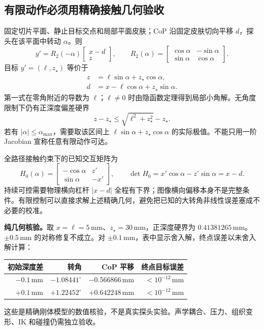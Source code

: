 \documentclass[11pt,a4paper]{article}
\numberwithin{equation}{section}
\theoremstyle{definition}
\begin{document}
\subsection{有限动作必须用精确接触几何验收}
固定切片平面、静止目标交点和局部平面皮肤；CoP 沿固定皮肤切向平移 $d$，探头在该平面中转动 $\alpha$。则
\begin{equation}
 y'=R_2(-\alpha)\begin{bmatrix}x-d\\z\end{bmatrix},\qquad
 R_2(\alpha)=\begin{bmatrix}\cos\alpha&-\sin\alpha\\\sin\alpha&\cos\alpha\end{bmatrix}.
\end{equation}
目标 $y'=(\ell,z_\star)$ 等价于
\begin{align}
 z&=\ell\sin\alpha+z_\star\cos\alpha,\\
 d&=x-\ell\cos\alpha+z_\star\sin\alpha.
\end{align}
第一式在零角附近的导数为 $\ell$；$\ell\ne0$ 时由隐函数定理得到局部小角解。无角度限制下仍有正深度偏差硬界
\begin{equation}
 z-z_\star\le\sqrt{\ell^2+z_\star^2}-z_\star.
\end{equation}
若有 $|\alpha|\le\alpha_{\max}$，需要取该区间上 $\ell\sin\alpha+z_\star\cos\alpha$ 的实际极值。不能只用一阶 Jacobian 宣称任意有限动作可达。

全路径接触约束下的已知交互矩阵为
\begin{equation}
 H_0(\alpha)=\begin{bmatrix}-\cos\alpha&z'\\\sin\alpha&-x'\end{bmatrix},\qquad
 \det H_0=x'\cos\alpha-z'\sin\alpha=x-d.
\end{equation}
持续可控需要物理横向杠杆 $|x-d|$ 全程有下界；图像横向偏移本身不是完整条件。有限控制可以直接求解上述精确几何，避免把已知的大转角非线性误差塞成不必要的校准。

\noindent\textbf{纯几何核验。}取 $x=\ell=5\,\mathrm{mm}$、$z_\star=30\,\mathrm{mm}$，正深度硬界为 $0.41381265\,\mathrm{mm}$。$\pm0.5\,\mathrm{mm}$ 的对称修复不成立。对 $\pm0.1\,\mathrm{mm}$，表中显示舍入解，终点误差以未舍入解计算：
\begin{center}
\begin{tabular}{rrrr}
\toprule
初始深度差 & 转角 & CoP 平移 & 终点目标误差\\
\midrule
$-0.1\,\mathrm{mm}$ & $-1.08441^\circ$ & $-0.566866\,\mathrm{mm}$ & $<10^{-12}\,\mathrm{mm}$\\
$+0.1\,\mathrm{mm}$ & $+1.22452^\circ$ & $+0.642248\,\mathrm{mm}$ & $<10^{-12}\,\mathrm{mm}$\\
\bottomrule
\end{tabular}
\end{center}
这些是精确刚体模型的数值核验，不是真实探头实验。声学耦合、压力、组织变形、IK 和碰撞仍需独立验收。
\end{document}
